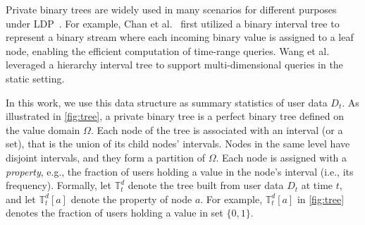 \documentclass[acmsmall]{acmart}
\newcommand{\Tree}{\mathbb{T}}
\newcommand{\DT}{\Tree^d}
\begin{document}
Private binary trees are widely used in many scenarios for different
purposes under LDP~\cite{Chan2011, Honaker2015, wang2019HIO}.
For example, Chan et al.~\cite{Chan2011} first utilized a binary interval tree
to represent a binary stream where each incoming binary value is assigned to a
leaf node, enabling the efficient computation of time-range queries.
Wang et al.~\cite{wang2019HIO} leveraged a hierarchy interval tree to support
multi-dimensional queries in the static setting.

In this work, we 
use this data structure as summary statistics of user data $D_t$. 
As illustrated in \cref{fig:tree}, a private binary tree is a perfect binary
tree defined on the value domain $\Omega$.
Each node of the tree is associated with an interval (or a set), that is the
union of its child nodes' intervals.
Nodes in the same level have disjoint intervals, and they form a partition of
$\Omega$.
Each node is assigned with a \emph{property}, e.g., the fraction of users
holding a value in the node's interval (i.e., its frequency).
Formally, let $\DT_t$ denote the tree built from user data $D_t$ at time $t$,
and let $\DT_t[a]$ denote the property of node $a$.
For example, $\DT_t[a]$ in \cref{fig:tree} denotes the fraction of users holding
a value in set $\{0,1\}$.
\end{document}
